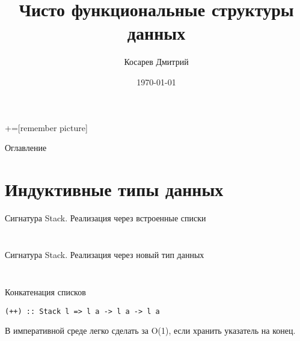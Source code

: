 \documentclass[aspectratio=169
  , xcolor={svgnames}
  , hyperref={ colorlinks,citecolor=DeepPink4
             , linkcolor=DarkRed,urlcolor=DarkBlue}
  , russian
  ]{beamer}
\title[]{Чисто функциональные структуры данных}
\author{Косарев Дмитрий }
\institute{матмех СПбГУ}
\date{\today}
\theoremstyle{exerciseStyle1}
\begin{document}
\maketitle

+=[remember picture] 

\everymath{\displaystyle}

\begin{frame}{Оглавление}
  \tableofcontents
\end{frame}

\section{Индуктивные типы данных}


\begin{frame}[fragile]{Сигнатура Stack. Реализация через встроенные списки}
\begin{minipage}{.48\textwidth}
\inputminted{haskell}{code/Stack.hs}
\end{minipage}
\begin{minipage}{.48\textwidth}
\inputminted{haskell}{code/ListStack.hs}
\end{minipage}
\end{frame}

\begin{frame}[fragile]{Сигнатура Stack. Реализация через новый тип данных}
\begin{minipage}{.48\textwidth}
  \inputminted{haskell}{code/Stack.hs}
\end{minipage}
\begin{minipage}{.48\textwidth}
  \inputminted{haskell}{code/CustomStack.hs}
\end{minipage}
\end{frame}

\begin{frame}[fragile]{Конкатенация списков}
\begin{verbatim}
(++) :: Stack l => l a -> l a -> l a
\end{verbatim}
В императивной среде легко сделать за O(1), если хранить указатель на конец.
\end{frame}
\end{document}
